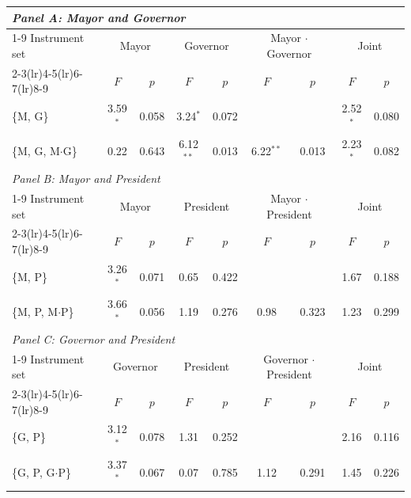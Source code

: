 \begin{tabular}{@{}lcccccccc@{}}
\toprule
\multicolumn{9}{l}{\textit{Panel A: Mayor and Governor}} \\
\cmidrule(lr){1-9}
Instrument set & \multicolumn{2}{c}{Mayor} & \multicolumn{2}{c}{Governor} & \multicolumn{2}{c}{Mayor $\cdot$ Governor} & \multicolumn{2}{c}{Joint} \\
\cmidrule(lr){2-3}\cmidrule(lr){4-5}\cmidrule(lr){6-7}\cmidrule(lr){8-9}
 & $F$ & $p$ & $F$ & $p$ & $F$ & $p$ & $F$ & $p$ \\
\midrule
\{M, G\} & 3.59$^{*}$ & 0.058 & 3.24$^{*}$ & 0.072 &  &  & 2.52$^{*}$ & 0.080 \\
\{M, G, M$\cdot$G\} & 0.22 & 0.643 & 6.12$^{**}$ & 0.013 & 6.22$^{**}$ & 0.013 & 2.23$^{*}$ & 0.082 \\
\midrule
\multicolumn{9}{l}{\textit{Panel B: Mayor and President}} \\
\cmidrule(lr){1-9}
Instrument set & \multicolumn{2}{c}{Mayor} & \multicolumn{2}{c}{President} & \multicolumn{2}{c}{Mayor $\cdot$ President} & \multicolumn{2}{c}{Joint} \\
\cmidrule(lr){2-3}\cmidrule(lr){4-5}\cmidrule(lr){6-7}\cmidrule(lr){8-9}
 & $F$ & $p$ & $F$ & $p$ & $F$ & $p$ & $F$ & $p$ \\
\midrule
\{M, P\} & 3.26$^{*}$ & 0.071 & 0.65 & 0.422 &  &  & 1.67 & 0.188 \\
\{M, P, M$\cdot$P\} & 3.66$^{*}$ & 0.056 & 1.19 & 0.276 & 0.98 & 0.323 & 1.23 & 0.299 \\
\midrule
\multicolumn{9}{l}{\textit{Panel C: Governor and President}} \\
\cmidrule(lr){1-9}
Instrument set & \multicolumn{2}{c}{Governor} & \multicolumn{2}{c}{President} & \multicolumn{2}{c}{Governor $\cdot$ President} & \multicolumn{2}{c}{Joint} \\
\cmidrule(lr){2-3}\cmidrule(lr){4-5}\cmidrule(lr){6-7}\cmidrule(lr){8-9}
 & $F$ & $p$ & $F$ & $p$ & $F$ & $p$ & $F$ & $p$ \\
\midrule
\{G, P\} & 3.12$^{*}$ & 0.078 & 1.31 & 0.252 &  &  & 2.16 & 0.116 \\
\{G, P, G$\cdot$P\} & 3.37$^{*}$ & 0.067 & 0.07 & 0.785 & 1.12 & 0.291 & 1.45 & 0.226 \\
\bottomrule
\end{tabular}
